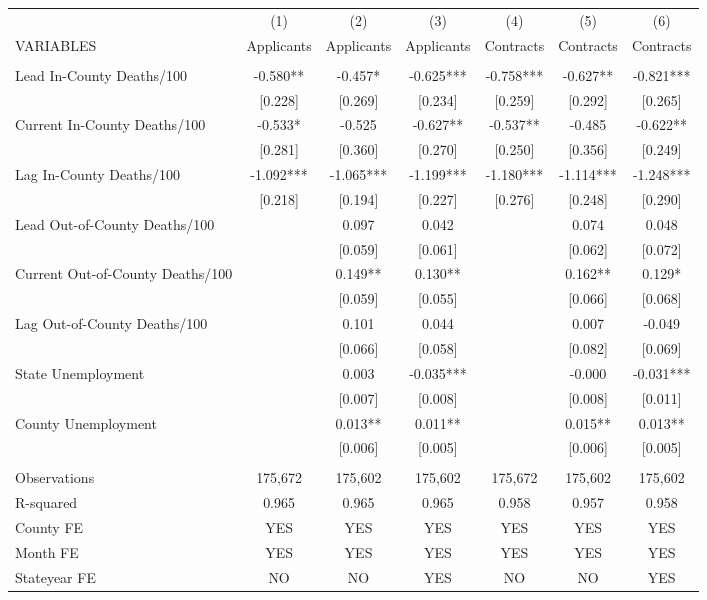 \documentclass[]{article}
\begin{document}
\begin{tabular}{lcccccc} \hline
 & (1) & (2) & (3) & (4) & (5) & (6) \\
VARIABLES & Applicants & Applicants & Applicants & Contracts & Contracts & Contracts \\ \hline
 &  &  &  &  &  &  \\
Lead In-County Deaths/100 & -0.580** & -0.457* & -0.625*** & -0.758*** & -0.627** & -0.821*** \\
 & [0.228] & [0.269] & [0.234] & [0.259] & [0.292] & [0.265] \\
Current In-County Deaths/100 & -0.533* & -0.525 & -0.627** & -0.537** & -0.485 & -0.622** \\
 & [0.281] & [0.360] & [0.270] & [0.250] & [0.356] & [0.249] \\
Lag In-County Deaths/100 & -1.092*** & -1.065*** & -1.199*** & -1.180*** & -1.114*** & -1.248*** \\
 & [0.218] & [0.194] & [0.227] & [0.276] & [0.248] & [0.290] \\
Lead Out-of-County Deaths/100 &  & 0.097 & 0.042 &  & 0.074 & 0.048 \\
 &  & [0.059] & [0.061] &  & [0.062] & [0.072] \\
Current Out-of-County Deaths/100 &  & 0.149** & 0.130** &  & 0.162** & 0.129* \\
 &  & [0.059] & [0.055] &  & [0.066] & [0.068] \\
Lag Out-of-County Deaths/100 &  & 0.101 & 0.044 &  & 0.007 & -0.049 \\
 &  & [0.066] & [0.058] &  & [0.082] & [0.069] \\
State Unemployment &  & 0.003 & -0.035*** &  & -0.000 & -0.031*** \\
 &  & [0.007] & [0.008] &  & [0.008] & [0.011] \\
County Unemployment &  & 0.013** & 0.011** &  & 0.015** & 0.013** \\
 &  & [0.006] & [0.005] &  & [0.006] & [0.005] \\
 &  &  &  &  &  &  \\
Observations & 175,672 & 175,602 & 175,602 & 175,672 & 175,602 & 175,602 \\
R-squared & 0.965 & 0.965 & 0.965 & 0.958 & 0.957 & 0.958 \\
County FE & YES & YES & YES & YES & YES & YES \\
Month FE & YES & YES & YES & YES & YES & YES \\
 Stateyear FE & NO & NO & YES & NO & NO & YES \\ \hline

\end{tabular}
\end{document}
